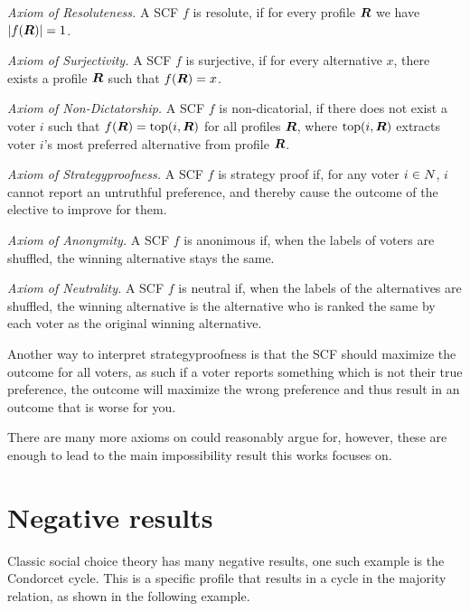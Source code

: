 \emph{Axiom of Resoluteness.} A SCF $f$ is resolute, if for every profile
$\boldsymbol{R}$ we have $|f(\boldsymbol{R})| = 1$.

\emph{Axiom of Surjectivity.} A SCF $f$ is surjective, if for every alternative
$x$, there exists a profile $\boldsymbol{R}$ such that
$f(\boldsymbol{R}) = x$.

\emph{Axiom of Non-Dictatorship.} A SCF $f$ is non-dicatorial, if there does not exist a voter $i$ such that $f(\boldsymbol{R}) = \textnormal{top}(i,\boldsymbol{R})$ for all profiles $\boldsymbol{R}$, where $\textnormal{top}(i,\boldsymbol{R})$  extracts voter $i$'s most preferred alternative from profile $\boldsymbol{R}$.

\emph{Axiom of Strategyproofness.} A SCF $f$ is strategy proof if, for any voter $i \in N$, $i$ cannot report an untruthful preference, and thereby cause the outcome of the elective to improve for them.

\emph{Axiom of Anonymity.} A SCF $f$ is anonimous if, when the labels of voters are shuffled, the winning alternative stays the same.

\emph{Axiom of Neutrality.} A SCF $f$ is neutral if, when the labels of the alternatives are shuffled, the winning alternative is the alternative who is ranked the same by each voter as the original winning alternative.

Another way to interpret strategyproofness is that the SCF should maximize the outcome for all voters, as such  if a voter reports something which is not their true preference, the outcome will maximize the wrong preference and thus result in an outcome that is worse for you.

There are many more axioms on could reasonably argue for, however, these are enough to lead to the main impossibility result this works focuses on.

\section{Negative results}
Classic social choice theory has many negative results, one such example is the Condorcet cycle. This is a specific profile that results in a cycle in the majority relation, as shown in the following example.

